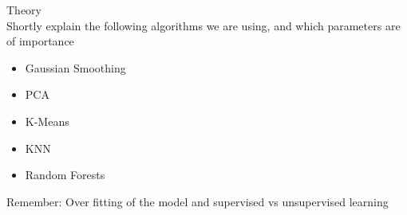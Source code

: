 \documentclass[report]{subfiles}
\begin{document}
Theory\\
Shortly explain the following algorithms we are using, and which parameters are of importance
\begin{itemize}
	\item Gaussian Smoothing
	\item PCA
	\item K-Means
	\item KNN
	\item Random Forests
\end{itemize}

Remember: Over fitting of the model and supervised vs unsupervised learning
\end{document}
